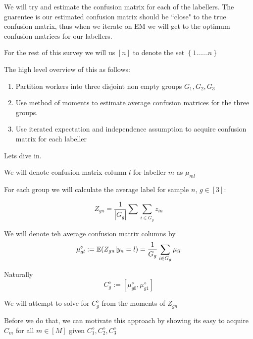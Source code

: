 We will try and estimate the confusion matrix for each of the labellers. The guarentee is our estimated confusion matrix should be ``close" to the true confusion matrix, thus when we iterate on EM we will get to the optimum confusion matrices for our labellers.

For the rest of this survey we will us $[n]$ to denote the set $\left\{1......n\right\}$

The high level overview of this as follows:

\begin{enumerate}
\item Partition workers into three disjoint non empty groups $G_{1},G_{2}, G_{3}$
\item Use method of moments to estimate average confusion matrices for the three groups.
\item Use iterated expectation and independence assumption to acquire confusion matrix for each labeller
\end{enumerate}

Lets dive in.

We will denote confusion matrix column $l$ for labeller $m$ as $\mu_{ml}$

For each group we will calculate the average label for sample $n$, $g \in [3]$:

\begin{equation}
Z_{gn} = \frac{1}{|G_{g}|} \displaystyle\sum\limits\sum_{i \in G_{g}} z_{in}
\end{equation}


We will denote teh average confusion matrix columns by 
\begin{equation}
\mu^{\diamond}_{gl} := \mathbb{E}(Z_{gn} | y_{n} = l) = \frac{1}{G_{g}} \displaystyle\sum\limits_{i \in G_{g}} \mu_{il}
\end{equation}

Naturally
\begin{equation}
C^{\diamond}_{g} := [\mu^{\diamond}_{g0},\mu^{\diamond}_{g1}]
\end{equation}

We will attempt to solve for $C^{\diamond}_{g}$ from the moments of $Z_{gn}$

Before we do that, we can motivate this approach by showing its easy to acquire $C_{m}$ for all $m \in [M]$  given $C^{\diamond}_{1},C^{\diamond}_{2},C^{\diamond}_{3}$ 


